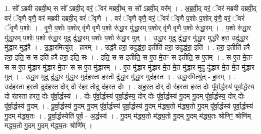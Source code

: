 \documentclass[17pt]{extarticle}
\begin{document}
1. सो᳚ ऽब्रवी दब्रवी॒थ् स सो᳚ ऽब्रवी॒द् वरं॒ ॅवर॑ मब्रवी॒थ् स सो᳚ ऽब्रवी॒द् वर᳚म् । . अ॒ब्र॒वी॒द् वरं॒ ॅवर॑ मब्रवी दब्रवी॒द् वरं॑ ॅवृणै वृणै॒ वर॑ मब्रवी दब्रवी॒द् वरं॑ ॅवृणै । . वरं॑ ॅवृणै वृणै॒ वरं॒ ॅवरं॑ ॅवृणै प॒शोः प॒शोर् वृ॑णै॒ वरं॒ ॅवरं॑ ॅवृणै प॒शोः । . वृ॒णै॒ प॒शोः प॒शोर् वृ॑णै वृणै प॒शो रु॑द्धा॒र मु॑द्धा॒रम् प॒शोर् वृ॑णै वृणै प॒शो रु॑द्धा॒रम् । . प॒शो रु॑द्धा॒र मु॑द्धा॒रम् प॒शोः प॒शो रु॑द्धा॒र मुदु दु॑द्धा॒रम् प॒शोः प॒शो रु॑द्धा॒र मुत् । . उ॒द्धा॒र मुदु दु॑द्धा॒र मु॑द्धा॒र मुद्ध॑रै हरा॒ उदु॑द्धा॒र मु॑द्धा॒र मुद्ध॑रै । . उ॒द्धा॒रमित्यु॑त् - हा॒रम् । . उद्ध॑रै हरा॒ उदुद्ध॑रा॒ इतीति॑ हरा॒ उदुद्ध॑रा॒ इति॑ । . ह॒रा॒ इतीति॑ हरै हरा॒ इति॒ स स इति॑ हरै हरा॒ इति॒ सः । . इति॒ स स इतीति॒ स ए॒त मे॒तꣳ स इतीति॒ स ए॒तम् । . स ए॒त मे॒तꣳ स स ए॒त मु॑द्धा॒र मु॑द्धा॒र मे॒तꣳ स स ए॒त मु॑द्धा॒रम् । . ए॒त मु॑द्धा॒र मु॑द्धा॒र मे॒त मे॒त मु॑द्धा॒र मुदु दु॑द्धा॒र मे॒त मे॒त मु॑द्धा॒र मुत् । . उ॒द्धा॒र मुदु दु॑द्धा॒र मु॑द्धा॒र मुद॑हरता हर॒तो दु॑द्धा॒र मु॑द्धा॒र मुद॑हरत । . उ॒द्धा॒रमित्यु॑त् - हा॒रम् । . उद॑हरता हर॒तो दुद॑हरत॒ दोर् दो र॑हर॒ तोदु द॑हरत॒ दोः । . अ॒ह॒र॒त॒ दोर् दो र॑हरता हरत॒ दोः पू᳚र्वा॒र्द्धस्य॑ पूर्वा॒र्द्धस्य॒ दो र॑हरता हरत॒ दोः पू᳚र्वा॒र्द्धस्य॑ । . दोः पू᳚र्वा॒र्द्धस्य॑ पूर्वा॒र्द्धस्य॒ दोर् दोः पू᳚र्वा॒र्द्धस्य॑ गु॒दम् गु॒दम् पू᳚र्वा॒र्द्धस्य॒ दोर् दोः पू᳚र्वा॒र्द्धस्य॑ गु॒दम् । . पू॒र्वा॒र्द्धस्य॑ गु॒दम् गु॒दम् पू᳚र्वा॒र्द्धस्य॑ पूर्वा॒र्द्धस्य॑ गु॒दम् म॑द्ध्य॒तो म॑द्ध्य॒तो गु॒दम् पू᳚र्वा॒र्द्धस्य॑ पूर्वा॒र्द्धस्य॑ गु॒दम् म॑द्ध्य॒तः । . पू॒र्वा॒र्द्धस्येति॑ पूर्व - अ॒र्द्धस्य॑ । . गु॒दम् म॑द्ध्य॒तो म॑द्ध्य॒तो गु॒दम् गु॒दम् म॑द्ध्य॒तः श्रोणिꣳ॒॒ श्रोणि॑म् मद्ध्य॒तो गु॒दम् गु॒दम् म॑द्ध्य॒तः श्रोणि᳚म् । \newline
\end{document}

